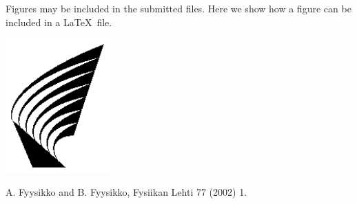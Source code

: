 \documentclass[12pt]{article}
\begin{document}
\begin{minipage}{9cm}
Figures may be included in the submitted files. Here we show
how a figure can be included in a \LaTeX\ file.
\end{minipage}
\hfill
\begin{minipage}{5cm}
\includegraphics[width=4cm]{logo.eps}
\end{minipage}


\begin{thebibliography}{9}

A. Fyysikko and B. Fyysikko, Fysiikan Lehti 77 (2002) 1.

\end{thebibliography}
\end{document}
